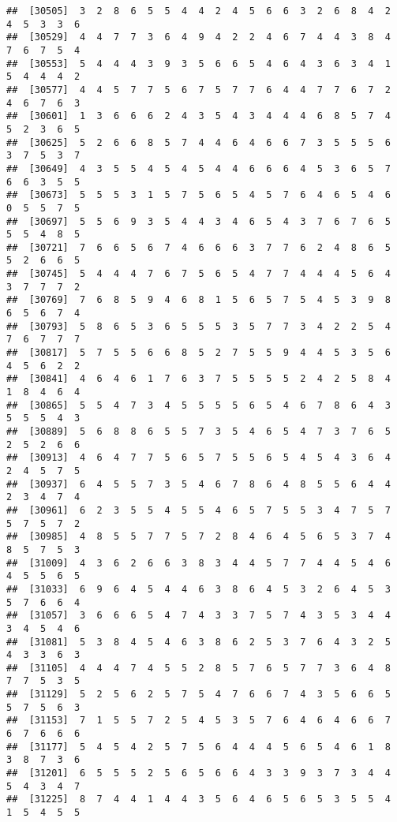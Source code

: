 \documentclass[
]{book}
\begin{document}
\begin{verbatim}
##  [30505]  3  2  8  6  5  5  4  4  2  4  5  6  6  3  2  6  8  4  2  4  5  3  3  6
##  [30529]  4  4  7  7  3  6  4  9  4  2  2  4  6  7  4  4  3  8  4  7  6  7  5  4
##  [30553]  5  4  4  4  3  9  3  5  6  6  5  4  6  4  3  6  3  4  1  5  4  4  4  2
##  [30577]  4  4  5  7  7  5  6  7  5  7  7  6  4  4  7  7  6  7  2  4  6  7  6  3
##  [30601]  1  3  6  6  6  2  4  3  5  4  3  4  4  4  6  8  5  7  4  5  2  3  6  5
##  [30625]  5  2  6  6  8  5  7  4  4  6  4  6  6  7  3  5  5  5  6  3  7  5  3  7
##  [30649]  4  3  5  5  4  5  4  5  4  4  6  6  6  4  5  3  6  5  7  6  6  3  5  5
##  [30673]  5  5  5  3  1  5  7  5  6  5  4  5  7  6  4  6  5  4  6  0  5  5  7  5
##  [30697]  5  5  6  9  3  5  4  4  3  4  6  5  4  3  7  6  7  6  5  5  5  4  8  5
##  [30721]  7  6  6  5  6  7  4  6  6  6  3  7  7  6  2  4  8  6  5  5  2  6  6  5
##  [30745]  5  4  4  4  7  6  7  5  6  5  4  7  7  4  4  4  5  6  4  3  7  7  7  2
##  [30769]  7  6  8  5  9  4  6  8  1  5  6  5  7  5  4  5  3  9  8  6  5  6  7  4
##  [30793]  5  8  6  5  3  6  5  5  5  3  5  7  7  3  4  2  2  5  4  7  6  7  7  7
##  [30817]  5  7  5  5  6  6  8  5  2  7  5  5  9  4  4  5  3  5  6  4  5  6  2  2
##  [30841]  4  6  4  6  1  7  6  3  7  5  5  5  5  2  4  2  5  8  4  1  8  4  6  4
##  [30865]  5  5  4  7  3  4  5  5  5  5  6  5  4  6  7  8  6  4  3  5  5  5  4  3
##  [30889]  5  6  8  8  6  5  5  7  3  5  4  6  5  4  7  3  7  6  5  2  5  2  6  6
##  [30913]  4  6  4  7  7  5  6  5  7  5  5  6  5  4  5  4  3  6  4  2  4  5  7  5
##  [30937]  6  4  5  5  7  3  5  4  6  7  8  6  4  8  5  5  6  4  4  2  3  4  7  4
##  [30961]  6  2  3  5  5  4  5  5  4  6  5  7  5  5  3  4  7  5  7  5  7  5  7  2
##  [30985]  4  8  5  5  7  7  5  7  2  8  4  6  4  5  6  5  3  7  4  8  5  7  5  3
##  [31009]  4  3  6  2  6  6  3  8  3  4  4  5  7  7  4  4  5  4  6  4  5  5  6  5
##  [31033]  6  9  6  4  5  4  4  6  3  8  6  4  5  3  2  6  4  5  3  5  7  6  6  4
##  [31057]  3  6  6  6  5  4  7  4  3  3  7  5  7  4  3  5  3  4  4  3  4  5  4  6
##  [31081]  5  3  8  4  5  4  6  3  8  6  2  5  3  7  6  4  3  2  5  4  3  3  6  3
##  [31105]  4  4  4  7  4  5  5  2  8  5  7  6  5  7  7  3  6  4  8  7  7  5  3  5
##  [31129]  5  2  5  6  2  5  7  5  4  7  6  6  7  4  3  5  6  6  5  5  7  5  6  3
##  [31153]  7  1  5  5  7  2  5  4  5  3  5  7  6  4  6  4  6  6  7  6  7  6  6  6
##  [31177]  5  4  5  4  2  5  7  5  6  4  4  4  5  6  5  4  6  1  8  3  8  7  3  6
##  [31201]  6  5  5  5  2  5  6  5  6  6  4  3  3  9  3  7  3  4  4  5  4  3  4  7
##  [31225]  8  7  4  4  1  4  4  3  5  6  4  6  5  6  5  3  5  5  4  1  5  4  5  5

\end{verbatim}
\end{document}
